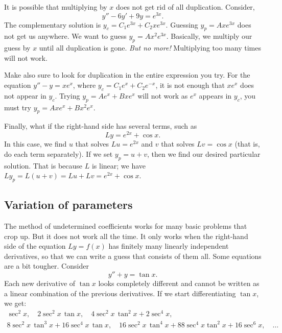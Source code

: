 \medskip

It is possible that
multiplying by $x$ does not get rid of all
duplication.  Consider,
\begin{equation*}
y''-6y'+9y = e^{3x} .
\end{equation*}
The complementary solution is
$y_c = C_1 e^{3x} + C_2 x e^{3x}$.  Guessing $y_p=A xe^{3x}$
does not get us anywhere.
We want to guess $y_p = Ax^2e^{3x}$.
Basically, we multiply our guess by $x$
until all duplication is gone.  \emph{But no more!}  Multiplying too many
times will not work.

Make also sure to look for duplication in the entire expression you try.  For
the equation $y''-y=xe^x$, where $y_c = C_1e^x + C_2e^{-x}$,
it is not enough that $xe^x$ does not appear in $y_c$.
Trying $y_p=Ae^x+Bxe^x$ will not work
as $e^x$ appears in $y_c$,
you must try $y_p=Axe^x+Bx^2e^x$.


\medskip

Finally, what if the right-hand side has several terms, such as
\begin{equation*}
Ly = e^{2x} + \cos x .
\end{equation*}
In this case, we find $u$ that solves $Lu = e^{2x}$ and $v$ that
solves $Lv = \cos x$ (that is, do each term separately).
If we set
$y_p = u+ v$, then we find our desired particular solution.
That is because $L$ is linear; we have
$Ly_p = L(u+v) = Lu + Lv = e^{2x} + \cos x$.

\subsection{Variation of parameters}

The method of undetermined coefficients works for many basic
problems that crop up.  But it does not work all the time.  It only works
when the right-hand side of the equation $Ly = f(x)$ has finitely many
linearly independent derivatives, so that we can write a guess that consists
of them all.  Some equations are a bit tougher.  Consider
\begin{equation*}
y''+y = \tan x .
\end{equation*}
Each new derivative of $\tan x$ looks completely different and
cannot be written as a linear combination of the previous derivatives.
If we start differentiating $\tan x$, we get:
\begin{multline*}
\sec^2 x, \quad
2\sec^2 x \, \tan x, \quad
4 \sec^2 x \, \tan^2 x + 2 \sec^4 x, \\
8 \sec^2 x \, \tan^3 x + 16 \sec^4 x \, \tan x, \quad
16\sec^2 x \, \tan^4 x + 88 \sec^4 x \tan^2 x + 16 \sec^6 x, \quad
\ldots
\end{multline*}

